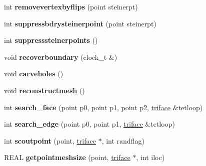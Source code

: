 \begin{DoxyCompactItemize}
\item 
\mbox{\label{classtetgenmesh_ad3277eea82fb5eb134c5eaa6abf5c18d}} 
int {\bfseries removevertexbyflips} (point steinerpt)
\item 
\mbox{\label{classtetgenmesh_aae5530d808e30771e717c94cb8586f0b}} 
int {\bfseries suppressbdrysteinerpoint} (point steinerpt)
\item 
\mbox{\label{classtetgenmesh_affc448708b6df2b57048544d3efd6e3c}} 
int {\bfseries suppresssteinerpoints} ()
\item 
\mbox{\label{classtetgenmesh_a1be7dce56688fbe7a97fc31f98b61c19}} 
void {\bfseries recoverboundary} (clock\+\_\+t \&)
\item 
\mbox{\label{classtetgenmesh_ad71017c71bd2cac0232c410a651ed085}} 
void {\bfseries carveholes} ()
\item 
\mbox{\label{classtetgenmesh_ad44b2ea3720da385a0cbcf306884e126}} 
void {\bfseries reconstructmesh} ()
\item 
\mbox{\label{classtetgenmesh_a62d8bbe163792703999dd9c6a302a6af}} 
int {\bfseries search\+\_\+face} (point p0, point p1, point p2, \hyperlink{classtetgenmesh_1_1triface}{triface} \&tetloop)
\item 
\mbox{\label{classtetgenmesh_a8240600d26ef0174b52b94a4692dc99a}} 
int {\bfseries search\+\_\+edge} (point p0, point p1, \hyperlink{classtetgenmesh_1_1triface}{triface} \&tetloop)
\item 
\mbox{\label{classtetgenmesh_a230d03da7e72e7092f5f51886806dd9b}} 
int {\bfseries scoutpoint} (point, \hyperlink{classtetgenmesh_1_1triface}{triface} $\ast$, int randflag)
\item 
\mbox{\label{classtetgenmesh_a88f9f3b6bb6fb16418d028dd7d920ad0}} 
R\+E\+AL {\bfseries getpointmeshsize} (point, \hyperlink{classtetgenmesh_1_1triface}{triface} $\ast$, int iloc)
\item 
\mbox{\label{classtetgenmesh_a78dbc1dcd69c15ee0f7f226be1078008}} 

\end{DoxyCompactItemize}
